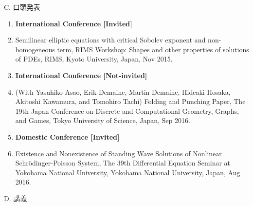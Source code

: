 \documentclass[a4j,twocolumn]{jarticle}
\begin{document}
\vspace{0.2cm}
\noindent
C. 口頭発表

\begin{enumerate}
 \item[] {\bf International Conference [Invited]}
 \item Semilinear elliptic equations with critical Sobolev exponent and
       non-homogeneous term, RIMS Workshop: Shapes and other properties
       of solutions of PDEs, RIMS, Kyoto University, Japan, Nov 2015. 
 \item[] {\bf International Conference [Not-invited]}
 \item (With Yasuhiko Asao, Erik Demaine, Martin Demaine, Hideaki
       Hosaka, Akitoshi Kawamura, and Tomohiro Tachi)
       Folding and Punching Paper, The 19th Japan Conference on Discrete
       and Computational Geometry, Graphs, and Games, Tokyo University
       of Science, Japan, Sep 2016.
 \item[] {\bf Domestic Conference [Invited]}
 \item Existence and Nonexistence of Standing Wave Solutions of
       Nonlinear Schr\"{o}dinger-Poisson System,
       The 39th Differential Equation Seminar at Yokohama National
       University, Yokohama National University, Japan, Aug 2016.
\end{enumerate}



\vspace{0.1cm}

\vspace{0.2cm}
\noindent
D. 講義

\vspace{0.1cm}
\end{document}
